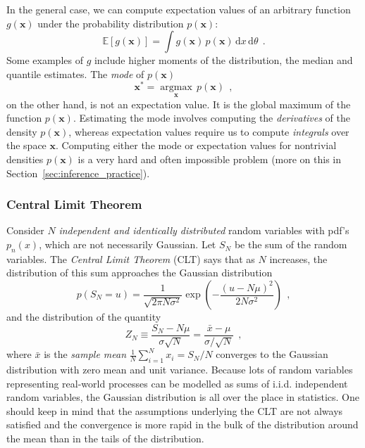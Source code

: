 \documentclass[12pt,dvipsnames]{report}
\newcommand{\ud}{\,\mathrm{d}}
\renewcommand{\vec}[1]{\boldsymbol{\mathbf{#1}}}
\newcommand{\hquad}{~~}
\begin{document}
In the general case, we can compute expectation values of an arbitrary function
$g(\vec{x})$ under the probability distribution $p(\vec{x})$:
\begin{equation}
    \mathbb{E}\left[g(\vec{x})\right]=\int g(\vec{x})\,p(\vec{x})\ud x
    \ud\theta
    \hquad.
\end{equation}
Some examples of $g$ include higher moments of the distribution, the median and
quantile estimates. The \emph{mode} of $p(\vec{x})$
\begin{equation}
    \vec{x}^{*}=\underset{\vec{x}}{\operatorname{argmax}}\,p(\vec{x})
    \hquad,
\end{equation}
on the other hand, is not an expectation value. It is the global maximum of the
function $p(\vec{x})$.
Estimating the mode involves computing the \emph{derivatives} of the density
$p(\vec{x})$, whereas expectation values require us to compute
\emph{integrals} over the space $\vec{x}$. Computing either
the mode or expectation values for nontrivial densities $p(\vec{x})$ is a very hard 
and often impossible problem (more on this in Section~\ref{sec:inference_practice}).

\subsubsection{Central Limit Theorem}
Consider $N$ \emph{independent and identically distributed} random variables
with pdf's $p_n(x)$, which are not necessarily Gaussian. Let $S_N$ be the sum
of the random variables. The \emph{Central Limit Theorem} (CLT) says that as $N$
increases, the distribution of this sum approaches the Gaussian distribution
\begin{equation}
    p\left(S_{N}=u\right)=\frac{1}{\sqrt{2 \pi N \sigma^{2}}} \exp \left(-\frac{(u-N \mu)^{2}}{2 N \sigma^{2}}\right)
    \hquad,
\end{equation}
and the distribution of the quantity
\begin{equation}
    Z_{N} \equiv \frac{S_{N}-N \mu}{\sigma \sqrt{N}}=\frac{\bar{x}-\mu}{\sigma / \sqrt{N}}
    \hquad,
\end{equation}
where $\bar{x}$ is the \emph{sample mean} $\frac{1}{N}\sum_{i=1}^Nx_i=S_N/N$
converges to the Gaussian distribution with zero mean and unit variance.
Because lots of random variables representing real-world processes can be modelled as sums
of i.i.d. independent random variables, the Gaussian distribution is all over the place
in statistics. One should keep in mind that the assumptions underlying the CLT are
not always satisfied and the convergence is 
more rapid in the bulk of the distribution around the mean than in the tails of the
distribution.
\end{document}
